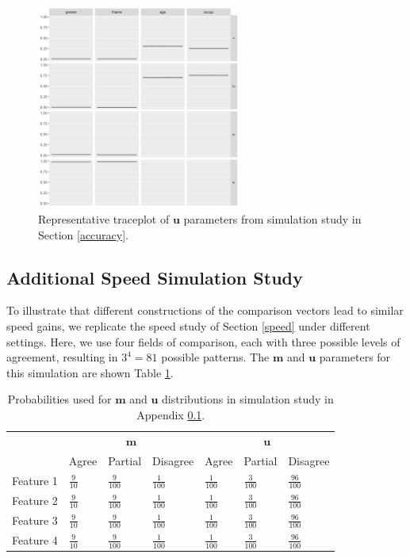 \documentclass[ba]{imsart}
\begin{document}
	\begin{figure}[!h]
		\begin{center}
			\includegraphics[width=0.6\textwidth]{../notes/figures/sim_u_trace} 
			\caption{Representative traceplot of $\bm{u}$ parameters from simulation study in Section \ref{accuracy}.}\label{fig:sim_u_trace}
		\end{center}
	\end{figure}

\clearpage

	\hypertarget{appendix-speed}{%
	\subsection{Additional Speed Simulation Study}\label{app:appendix-speed}}
	To illustrate that different constructions of the comparison vectors lead to similar speed gains, we replicate the speed study of Section \ref{speed} under different settings. Here, we use four fields of comparison, each with three possible levels of agreement, resulting in $3^4 = 81$ possible patterns. The $\bm{m}$ and $\bm{u}$ parameters for this simulation are shown Table \ref{Tab:distributions_2}.
	
		\begin{table}[t]
		\centering
		\begin{tabular}{llll|lll}
			\multicolumn{1}{c}{ } & \multicolumn{3}{c}{$\bm{m}$} & \multicolumn{3}{c}{$\bm{u}$} \\
			\cline{2-4} \cline{5-7}
			& Agree & Partial & Disagree & Agree & Partial & Disagree \\
			\hline
			Feature 1 & $\frac{9}{10}$ & $\frac{9}{100}$  & $\frac{1}{100}$ & $\frac{1}{100}$ &  $\frac{3}{100}$ & $\frac{96}{100}$ \\ 
			Feature 2 & $\frac{9}{10}$ & $\frac{9}{100}$  & $\frac{1}{100}$ & $\frac{1}{100}$ &  $\frac{3}{100}$ & $\frac{96}{100}$ \\ 
			Feature 3 & $\frac{9}{10}$ & $\frac{9}{100}$  & $\frac{1}{100}$ & $\frac{1}{100}$ &  $\frac{3}{100}$ & $\frac{96}{100}$ \\ 
			Feature 4 & $\frac{9}{10}$ & $\frac{9}{100}$  & $\frac{1}{100}$ & $\frac{1}{100}$ &  $\frac{3}{100}$ & $\frac{96}{100}$ \\ 
			\hline
		\end{tabular}
		\caption{Probabilities used for $\bm{m}$ and $\bm{u}$ distributions in simulation study in Appendix \ref{app:appendix-speed}.}\label{Tab:distributions_2}
	\end{table}
	
\end{document}

